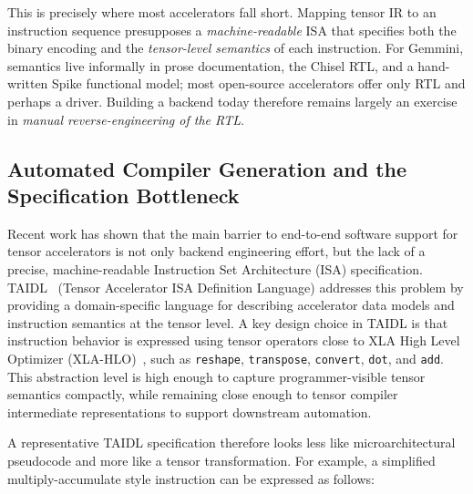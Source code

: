 This is precisely where most accelerators fall short.
Mapping tensor IR to an instruction sequence presupposes a \emph{machine-readable} ISA that specifies both the binary encoding and the \emph{tensor-level semantics} of each instruction.
For Gemmini, semantics live informally in prose documentation, the Chisel RTL, and a hand-written Spike functional model; most open-source accelerators offer only RTL and perhaps a driver.
Building a backend today therefore remains largely an exercise in \emph{manual reverse-engineering of the RTL}.

\subsection{Automated Compiler Generation and the Specification Bottleneck}
\label{subsec:spec-bottleneck}

Recent work has shown that the main barrier to end-to-end software support for tensor accelerators is not only backend engineering effort, but the lack of a precise, machine-readable Instruction Set Architecture (ISA) specification. TAIDL~\cite{taidl-micro2025} (Tensor Accelerator ISA Definition Language) addresses this problem by providing a domain-specific language for describing accelerator data models and instruction semantics at the tensor level. A key design choice in TAIDL is that instruction behavior is expressed using tensor operators close to XLA High Level Optimizer (XLA-HLO)~\cite{xla}, such as \texttt{reshape}, \texttt{transpose}, \texttt{convert}, \texttt{dot}, and \texttt{add}. This abstraction level is high enough to capture programmer-visible tensor semantics compactly, while remaining close enough to tensor compiler intermediate representations to support downstream automation.

A representative TAIDL specification therefore looks less like microarchitectural pseudocode and more like a tensor transformation. For example, a simplified multiply-accumulate style instruction can be expressed as follows:

